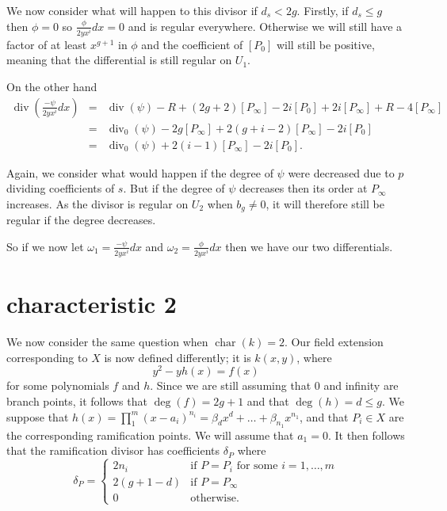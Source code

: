 \documentclass[draft, 11pt]{article} %
\theoremstyle{plain}
\theoremstyle{remark}
\DeclareMathOperator{\di}{div}
\DeclareMathOperator{\cha}{char}
\begin{document}
We now consider what will happen to this divisor if $d_s < 2g$.
Firstly, if $d_s \leq g$ then $\phi = 0$ so $\frac{\phi}{2yx^i}dx = 0$ and is regular everywhere.
Otherwise we will still have a factor of at least $x^{g+1}$ in $\phi$ and the coefficient of $[P_0]$ will still be positive, meaning that the differential is still regular on $U_1$.

On the other hand
\begin{eqnarray*}
\di \left( \frac{-\psi}{2yx^i}dx\right) & = & \di (\psi ) -R + (2g+2)[P_\infty] - 2i[P_0] + 2i[P_\infty] + R -4[P_\infty] \\
& = & \di_0(\psi) - 2g[P_\infty] + 2(g+i-2)[P_\infty] -2i[P_0] \\
& = & \di_0(\psi) + 2(i-1)[P_\infty] - 2i[P_0].
\end{eqnarray*}

Again, we consider what would happen if the degree of $\psi$ were decreased due to $p$ dividing coefficients of $s$.
But if the degree of $\psi$ decreases then its order at $P_\infty$ increases.
As the divisor is regular on $U_2$ when $b_g \neq 0$, it will therefore still be regular if the degree decreases.


So if we now let $\omega_1 = \frac{-\psi}{2yx^i}dx$ and $\omega_2 = \frac{\phi}{2yx^i}dx$ then we have our two differentials.

\newpage

\section{characteristic 2}

We now consider the same question when $\cha (k) = 2$.
Our field extension corresponding to $X$ is now defined differently; it is $k(x,y)$, where
\[
y^2 - yh(x) = f(x)
\]
for some polynomials $f$ and $h$.
Since we are still assuming that $0$ and infinity are branch points, it follows that $\deg(f) = 2g+1$ and that $\deg(h)  = d  \leq g$. 
We suppose that $h(x) = \prod_1^m (x-a_i)^{n_i} = \beta_d x^d + \ldots + \beta_{n_1} x^{n_1}$, and that $P_i\in X$ are the corresponding ramification points.
We will assume that $a_1 = 0$.
It then follows that the ramification divisor has coefficients $\delta_P$ where
\[
\delta_P = \left \{ \begin{array}{ll}
2n_i & \text{if } P= P_i \text{ for some } i=1, \ldots , m \\
2(g+1-d) & \text{if } P=P_\infty \\
0 & \text{otherwise.}
\end{array}
\right.
\]
\end{document}
